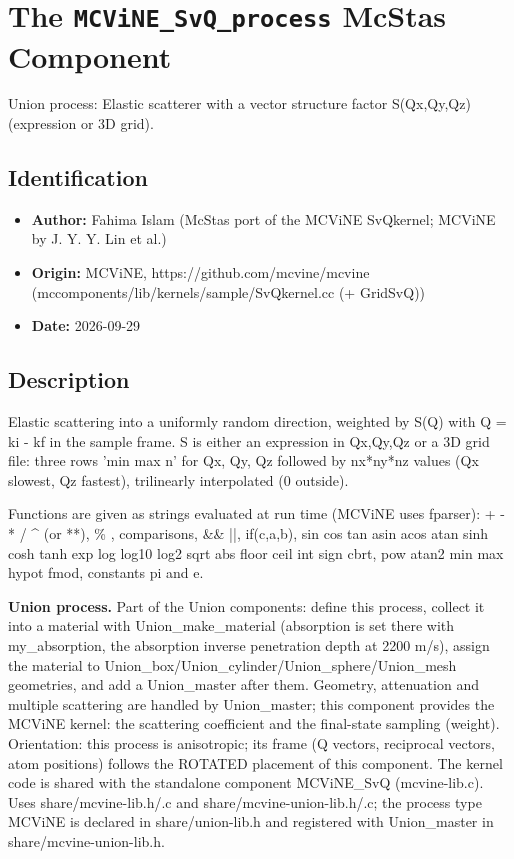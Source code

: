 \section{The \texttt{MCViNE\_SvQ\_process} McStas Component}
Union process: Elastic scatterer with a vector structure factor S(Qx,Qy,Qz) (expression or 3D grid).

\subsection*{Identification}
\begin{itemize}
  \item \textbf{Author:} Fahima Islam (McStas port of the MCViNE SvQkernel; MCViNE by J. Y. Y. Lin et al.)
  \item \textbf{Origin:} MCViNE, https://github.com/mcvine/mcvine (mccomponents/lib/kernels/sample/SvQkernel.cc (+ GridSvQ))
  \item \textbf{Date:} 2026-09-29
\end{itemize}

\subsection*{Description}
Elastic scattering into a uniformly random direction, weighted by S(Q) with Q = ki - kf in the sample frame. S is either an expression in Qx,Qy,Qz or a 3D grid file: three rows 'min max n' for Qx, Qy, Qz followed by nx*ny*nz values (Qx slowest, Qz fastest), trilinearly interpolated (0 outside).

Functions are given as strings evaluated at run time (MCViNE uses fparser): + - * / \textasciicircum{} (or **), \% , comparisons, \&\& ||, if(c,a,b), sin cos tan asin acos atan sinh cosh tanh exp log log10 log2 sqrt abs floor ceil int sign cbrt, pow atan2 min max hypot fmod, constants pi and e.

\textbf{Union process.} Part of the Union components: define this process, collect it into a material with Union\_make\_material (absorption is set there with my\_absorption, the absorption inverse penetration depth at 2200 m/s), assign the material to Union\_box/Union\_cylinder/Union\_sphere/Union\_mesh geometries, and add a Union\_master after them. Geometry, attenuation and multiple scattering are handled by Union\_master; this component provides the MCViNE kernel: the scattering coefficient and the final-state sampling (weight). Orientation: this process is anisotropic; its frame (Q vectors, reciprocal vectors, atom positions) follows the ROTATED placement of this component. The kernel code is shared with the standalone component MCViNE\_SvQ (mcvine-lib.c). Uses share/mcvine-lib.h/.c and share/mcvine-union-lib.h/.c; the process type MCViNE is declared in share/union-lib.h and registered with Union\_master in share/mcvine-union-lib.h.


